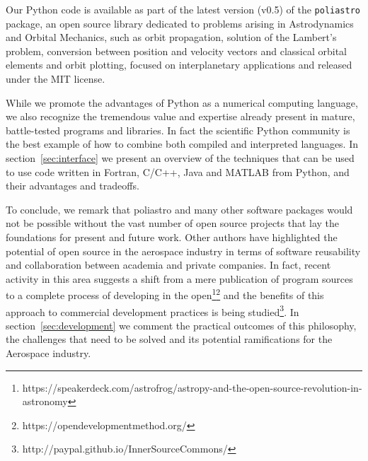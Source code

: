 Our Python code is available as part of the latest version (v0.5) of the \verb|poliastro| package, an open source library dedicated to problems arising in Astrodynamics and Orbital Mechanics, such as orbit propagation, solution of the Lambert's problem, conversion between position and velocity vectors and classical orbital elements and orbit plotting, focused on interplanetary applications and released under the MIT license\cite{juan_luis_cano_rodriguez_2016_47068}.

While we promote the advantages of Python as a numerical computing language, we also recognize the tremendous value and expertise already present in mature, battle-tested programs and libraries. In fact the scientific Python community is the best example of how to combine both compiled and interpreted languages. In section~\ref{sec:interface} we present an overview of the techniques that can be used to use code written in Fortran, C/C++, Java and MATLAB from Python, and their advantages and tradeoffs.

To conclude, we remark that poliastro and many other software packages would not be possible without the vast number of open source projects that lay the foundations for present and future work. Other authors have highlighted the potential of open source in the aerospace industry in terms of software reusability and collaboration between academia and private companies\citep{Ziemer2012}. In fact, recent activity in this area suggests a shift from a mere publication of program sources to a complete process of developing in the open\footnote{https://speakerdeck.com/astrofrog/astropy-and-the-open-source-revolution-in-astronomy}\footnote{https://opendevelopmentmethod.org/} and the benefits of this approach to commercial development practices is being studied\footnote{http://paypal.github.io/InnerSourceCommons/}. In section~\ref{sec:development} we comment the practical outcomes of this philosophy, the challenges that need to be solved and its potential ramifications for the Aerospace industry.
